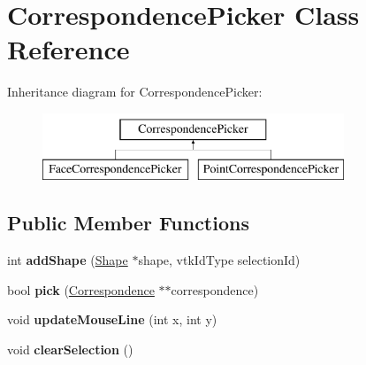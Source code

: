 \hypertarget{class_correspondence_picker}{}\section{Correspondence\+Picker Class Reference}
\label{class_correspondence_picker}
Inheritance diagram for Correspondence\+Picker\+:\begin{figure}[H]
\begin{center}
\leavevmode
\includegraphics[height=2.000000cm]{class_correspondence_picker}
\end{center}
\end{figure}
\subsection*{Public Member Functions}
\begin{DoxyCompactItemize}
\item 
\hypertarget{class_correspondence_picker_adac4887aba7012e30460bec9774ecda3}{}int {\bfseries add\+Shape} (\hyperlink{class_shape}{Shape} $\ast$shape, vtk\+Id\+Type selection\+Id)\label{class_correspondence_picker_adac4887aba7012e30460bec9774ecda3}

\item 
\hypertarget{class_correspondence_picker_aa0d44137c5312b42138b6a16c795fe4f}{}bool {\bfseries pick} (\hyperlink{class_correspondence}{Correspondence} $\ast$$\ast$correspondence)\label{class_correspondence_picker_aa0d44137c5312b42138b6a16c795fe4f}

\item 
\hypertarget{class_correspondence_picker_a29a99b7b5adfb4c2514b1a67de5a877e}{}void {\bfseries update\+Mouse\+Line} (int x, int y)\label{class_correspondence_picker_a29a99b7b5adfb4c2514b1a67de5a877e}

\item 
\hypertarget{class_correspondence_picker_a2394504b680fc8344c26e57e899f08a9}{}void {\bfseries clear\+Selection} ()\label{class_correspondence_picker_a2394504b680fc8344c26e57e899f08a9}

\end{DoxyCompactItemize}
